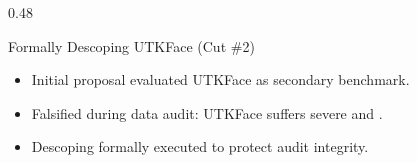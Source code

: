 \begin{frame}
\begin{columns}[T]
\begin{column}{0.48\textwidth}
      \vspace{0.15cm}
      \begin{alertcard}{Formally Descoping UTKFace (Cut \#2)}
        \scriptsize
        \begin{itemize}\scriptsize
          \item Initial proposal evaluated UTKFace as secondary benchmark.
          \item Falsified during data audit: UTKFace suffers severe  and .
          \item Descoping formally executed to protect audit integrity.
        \end{itemize}
      \end{alertcard}
    \end{column}
  \end{columns}
\end{frame}
